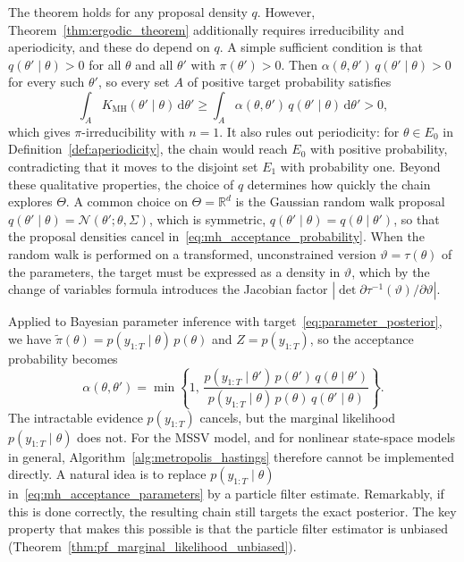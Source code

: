 The theorem holds for any proposal density $q$. However, Theorem~\ref{thm:ergodic_theorem} additionally requires irreducibility and aperiodicity, and these do depend on $q$. A simple sufficient condition is that $q(\theta'\mid\theta)>0$ for all $\theta$ and all $\theta'$ with $\pi(\theta')>0$. Then $\alpha(\theta,\theta')\,q(\theta'\mid\theta)>0$ for every such $\theta'$, so every set $A$ of positive target probability satisfies
\begin{equation}
    \int_A K_{\mathrm{MH}}(\theta'\mid\theta)\,\mathrm{d}\theta' \ge \int_{A} \alpha(\theta,\theta')\,q(\theta'\mid\theta)\,\mathrm{d}\theta' > 0,
\end{equation}
which gives $\pi$-irreducibility with $n=1$. It also rules out periodicity: for $\theta\in E_0$ in Definition~\ref{def:aperiodicity}, the chain would reach $E_0$ with positive probability, contradicting that it moves to the disjoint set $E_1$ with probability one. Beyond these qualitative properties, the choice of $q$ determines how quickly the chain explores $\Theta$. A common choice on $\Theta=\mathbb{R}^d$ is the Gaussian random walk proposal $q(\theta'\mid\theta) = \mathcal{N}(\theta';\theta,\Sigma)$, which is symmetric, $q(\theta'\mid\theta) = q(\theta\mid\theta')$, so that the proposal densities cancel in~\eqref{eq:mh_acceptance_probability}. When the random walk is performed on a transformed, unconstrained version $\vartheta = \tau(\theta)$ of the parameters, the target must be expressed as a density in $\vartheta$, which by the change of variables formula introduces the Jacobian factor $|\det \partial\tau^{-1}(\vartheta)/\partial\vartheta|$.

Applied to Bayesian parameter inference with target~\eqref{eq:parameter_posterior}, we have $\tilde{\pi}(\theta) = p(y_{1:T}\mid\theta)\,p(\theta)$ and $Z = p(y_{1:T})$, so the acceptance probability becomes
\begin{equation}
    \alpha(\theta,\theta') = \min\left\{1,\, \frac{p(y_{1:T}\mid\theta')\,p(\theta')\,q(\theta\mid\theta')}{p(y_{1:T}\mid\theta)\,p(\theta)\,q(\theta'\mid\theta)}\right\}.
    \label{eq:mh_acceptance_parameters}
\end{equation}
The intractable evidence $p(y_{1:T})$ cancels, but the marginal likelihood $p(y_{1:T}\mid\theta)$ does not. For the MSSV model, and for nonlinear state-space models in general, Algorithm~\ref{alg:metropolis_hastings} therefore cannot be implemented directly. A natural idea is to replace $p(y_{1:T}\mid\theta)$ in~\eqref{eq:mh_acceptance_parameters} by a particle filter estimate. Remarkably, if this is done correctly, the resulting chain still targets the exact posterior. The key property that makes this possible is that the particle filter estimator is unbiased (Theorem~\ref{thm:pf_marginal_likelihood_unbiased}).


